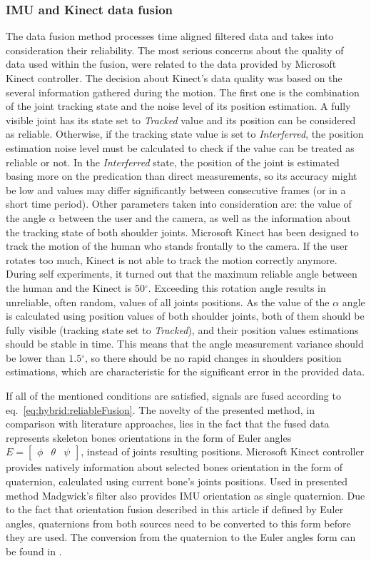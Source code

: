 \documentclass[sensors,article,submit,moreauthors,pdftex,10pt,a4paper]{mdpi}
\newcommand{\degree}{\ensuremath{{}^{\circ}}\xspace}
\begin{document}
\subsubsection{IMU and Kinect data fusion}
The data fusion method processes time aligned filtered data and takes into consideration their reliability. The most serious concerns about the quality of data used within the fusion, were related to the data provided by Microsoft Kinect controller. The decision about Kinect’s data quality was based on the several information gathered during the motion. The first one is the combination of the joint tracking state and the noise level of its position estimation. A fully visible joint has its state set to \emph{Tracked} value and its position can be considered as reliable. Otherwise, if the tracking state value is set to \emph{Interferred}, the position estimation noise level must be calculated to check if the value can be treated as reliable or not. In the \emph{Interferred} state, the position of the joint is estimated basing more on the predication than direct measurements, so its accuracy might be low and values may differ significantly between consecutive frames (or in a short time period). Other parameters taken into consideration are: the value of the angle $\alpha$ between the user and the camera, as well as the information about the tracking state of both shoulder joints. Microsoft Kinect has been designed to track the motion of the human who stands frontally to the camera. If the user rotates too much, Kinect is not able to track the motion correctly anymore. During self experiments, it turned out that the maximum reliable angle between the human and the Kinect is $50\degree$. Exceeding this rotation angle results in unreliable, often random, values of all joints positions. As the value of the $\alpha$ angle is calculated using position values of both shoulder joints, both of them should be fully visible (tracking state set to \emph{Tracked}), and their position values estimations should be stable in time. This means that the angle measurement variance should be lower than $1.5\degree$, so there should be no rapid changes in shoulders position estimations, which are characteristic for the significant error in the provided data. 
		
If all of the mentioned conditions are satisfied, signals are fused according to eq.~\ref{eq:hybrid:reliableFusion}. The novelty of the presented method, in comparison with literature approaches, lies in the fact that the fused data represents skeleton bones orientations in the form of Euler angles $E = \begin{bmatrix} \phi &  \theta & \psi \end{bmatrix}$, instead of joints resulting positions. Microsoft Kinect controller provides natively information about selected bones orientation in the form of quaternion, calculated using current bone's joints positions. Used in presented method Madgwick's filter also provides IMU orientation as single quaternion. Due to the fact that orientation fusion described in this article if defined by Euler angles, quaternions from both sources need to be converted to this form before they are used. The conversion from the quaternion to the Euler angles form can be found in \cite{Dunn2011}.
		
\end{document}
